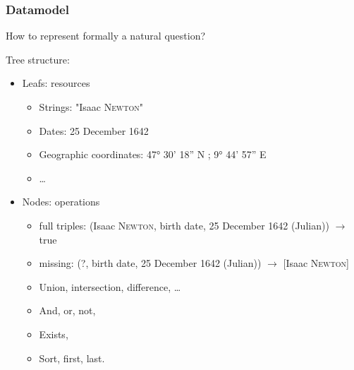 \begin{frame}[fragile]
    \frametitle{Datamodel}
    How to represent formally a natural question?    
    
    Tree structure:
    \begin{itemize}
        \item Leafs: resources
            \begin{itemize}
                \item Strings: "Isaac \textsc{Newton}"
                \item Dates: 25 December 1642
                \item Geographic coordinates: 47° 30' 18'' N ; 9° 44' 57'' E  
                \item \ldots
            \end{itemize}
        \item Nodes: operations
            \begin{itemize}
                \item full triples: (Isaac \textsc{Newton}, birth date, 25 December 1642 (Julian)) $\rightarrow$ true
                \item missing: (?, birth date, 25 December 1642 (Julian)) $\rightarrow$ [Isaac \textsc{Newton}]
                \item Union, intersection, difference, \ldots
                \item And, or, not,
                \item Exists,
                \item Sort, first, last.
            \end{itemize}
    \end{itemize}
\end{frame}

